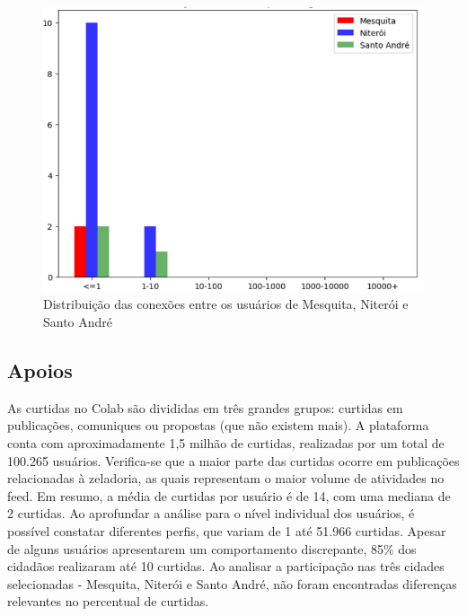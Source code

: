 \begin{figure}[!htb]
	\caption{Distribuição das conexões entre os usuários de Mesquita, Niterói e Santo André}
	\label{fig:colab_users_by_connections_on_cities}
	\centering
	\includegraphics[scale=0.5]{images/colab_users_by_connections_on_cities.png}
\end{figure}

\subsection*{Apoios}

As curtidas no Colab são divididas em três grandes grupos: curtidas em publicações, comuniques ou propostas (que não existem mais). A plataforma conta com aproximadamente 1,5 milhão de curtidas, realizadas por um total de 100.265 usuários. Verifica-se que a maior parte das curtidas ocorre em publicações relacionadas à zeladoria, as quais representam o maior volume de atividades no feed. Em resumo, a média de curtidas por usuário é de 14, com uma mediana de 2 curtidas. Ao aprofundar a análise para o nível individual dos usuários, é possível constatar diferentes perfis, que variam de 1 até 51.966 curtidas. Apesar de alguns usuários apresentarem um comportamento discrepante, 85\% dos cidadãos realizaram até 10 curtidas. Ao analisar a participação nas três cidades selecionadas - Mesquita, Niterói e Santo André, não foram encontradas diferenças relevantes no percentual de curtidas.

